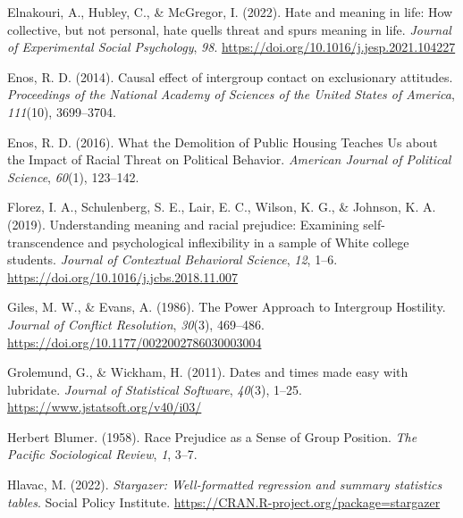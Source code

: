 \documentclass[
  man,floatsintext]{apa7}
\newlength{\cslhangindent}
\newlength{\cslentryspacingunit} %
\newenvironment{CSLReferences}[2] %
 {%
  \setlength{\parindent}{0pt}
  \ifodd #1
  \let\oldpar\par
  \def\par{\hangindent=\cslhangindent\oldpar}
  \fi
  \setlength{\parskip}{#2\cslentryspacingunit}
 }%
 {}
\begin{document}
\begin{CSLReferences}{1}{0}
\leavevmode{}%
Elnakouri, A., Hubley, C., \& McGregor, I. (2022). Hate and meaning in life: {How} collective, but not personal, hate quells threat and spurs meaning in life. \emph{Journal of Experimental Social Psychology}, \emph{98}. \url{https://doi.org/10.1016/j.jesp.2021.104227}

\leavevmode{}%
Enos, R. D. (2014). Causal effect of intergroup contact on exclusionary attitudes. \emph{Proceedings of the National Academy of Sciences of the United States of America}, \emph{111}(10), 3699--3704.

\leavevmode{}%
Enos, R. D. (2016). What the {Demolition} of {Public Housing Teaches Us} about the {Impact} of {Racial Threat} on {Political Behavior}. \emph{American Journal of Political Science}, \emph{60}(1), 123--142.

\leavevmode{}%
Florez, I. A., Schulenberg, S. E., Lair, E. C., Wilson, K. G., \& Johnson, K. A. (2019). Understanding meaning and racial prejudice: {Examining} self-transcendence and psychological inflexibility in a sample of {White} college students. \emph{Journal of Contextual Behavioral Science}, \emph{12}, 1--6. \url{https://doi.org/10.1016/j.jcbs.2018.11.007}

\leavevmode{}%
Giles, M. W., \& Evans, A. (1986). The {Power Approach} to {Intergroup Hostility}. \emph{Journal of Conflict Resolution}, \emph{30}(3), 469--486. \url{https://doi.org/10.1177/0022002786030003004}

\leavevmode{}%
Grolemund, G., \& Wickham, H. (2011). Dates and times made easy with {lubridate}. \emph{Journal of Statistical Software}, \emph{40}(3), 1--25. \url{https://www.jstatsoft.org/v40/i03/}

\leavevmode{}%
Herbert Blumer. (1958). Race {Prejudice} as a {Sense} of {Group Position}. \emph{The Pacific Sociological Review}, \emph{1}, 3--7.

\leavevmode{}%
Hlavac, M. (2022). \emph{Stargazer: Well-formatted regression and summary statistics tables}. Social Policy Institute. \url{https://CRAN.R-project.org/package=stargazer}


\end{CSLReferences}
\end{document}
